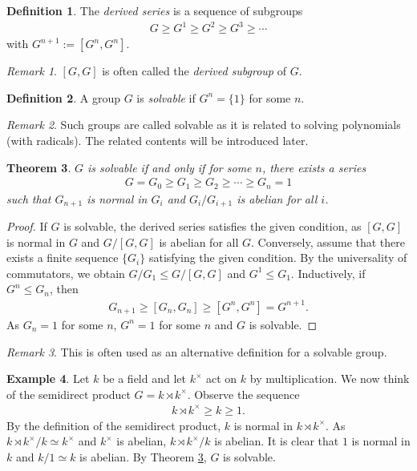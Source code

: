 \documentclass[12pt]{report}
\theoremstyle{plain}
\newtheorem{theorem}{Theorem}[section]
\theoremstyle{remark}
\newtheorem*{remark}{Remark}
\theoremstyle{definition}
\newtheorem{definition}[theorem]{Definition}
\newtheorem{example}[theorem]{Example}
\begin{document}
\begin{definition}
    The \emph{derived series} is a sequence of subgroups
    \begin{align*}
        G \ge G^1 \ge G^2 \ge G^3 \ge \cdots
    \end{align*}
    with $G^{n+1} := [G^n,G^n]$.
\end{definition}
\begin{remark}
    $[G,G]$ is often called the \emph{derived subgroup} of $G$.
\end{remark}

\begin{definition}
    A group $G$ is \emph{solvable} if $G^n=\{1\}$ for some $n$.
\end{definition}
\begin{remark}
    Such groups are called solvable as it is related to solving polynomials (with radicals). The related contents will be introduced later.
\end{remark}

\begin{theorem}\label{Theorem 1.13.6.}
    $G$ is solvable if and only if for some $n$, there exists a series
    \begin{align*}
        G=G_0\ge G_1\ge G_2\ge \cdots\ge G_n = 1
    \end{align*}
    such that $G_{n+1}$ is normal in $G_i$ and $G_i/G_{i+1}$ is abelian for all $i$.
\end{theorem}
\begin{proof}
    If $G$ is solvable, the derived series satisfies the given condition, as $[G,G]$ is normal in $G$ and $G/[G,G]$ is abelian for all $G$. Conversely, assume that there exists a finite sequence $\{G_i\}$ satisfying the given condition. By the universality of commutators, we obtain $G/G_1\le G/[G,G]$ and $G^1 \le G_1$. Inductively, if $G^n\le G_n$, then
    \begin{align*}
        G_{n+1} \ge [G_n,G_n] \ge [G^n,G^n]=G^{n+1}.
    \end{align*}
    As $G_n=1$ for some $n$, $G^n=1$ for some $n$ and $G$ is solvable.
\end{proof}
\begin{remark}
    This is often used as an alternative definition for a solvable group.
\end{remark}

\begin{example}
    Let $k$ be a field and let $k^\times$ act on $k$ by multiplication. We now think of the semidirect product $G=k\rtimes k^\times$. Observe the sequence
    \begin{align*}
        k\rtimes k^\times \ge k \ge 1.
    \end{align*}
    By the definition of the semidirect product, $k$ is normal in $k\rtimes k^\times$. As $k\rtimes k^\times / k \simeq k^\times$ and $k^\times$ is abelian, $k\rtimes k^\times / k$ is abelian. It is clear that $1$ is normal in $k$ and $k/1\simeq k$ is abelian. By Theorem \ref{Theorem 1.13.6.}, $G$ is solvable.
\end{example}
\end{document}
